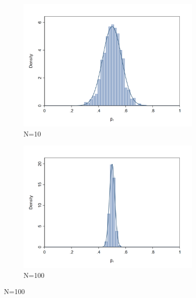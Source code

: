 \documentclass[a4paper,12pt]{article}
\begin{document}
\begin{figure}[H]
        \begin{subfigure}[c]{0.49\columnwidth}
            \centering
            \includegraphics[width=1\textwidth]{figures/distribution_beta1_10}
            \caption{N=10}
            \label{fig:distribution beta1 N10}								
        \end{subfigure}
        \begin{subfigure}[c]{0.49\columnwidth}
            \centering
            \includegraphics[width=1\columnwidth]{figures/distribution_beta1_100}
            \caption{N=100}
            \label{fig:distribution beta1 N100}								
        \end{subfigure}
    \end{figure}
\end{document}
